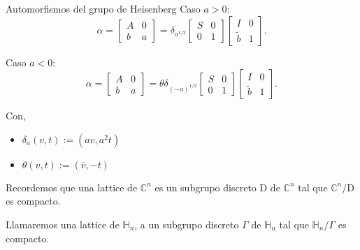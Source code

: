 \documentclass{beamer}
\begin{document}
\begin{frame}{Automorfismos del grupo de Heisenberg}
Caso $a>0$:
 $$\alpha=
 \begin{bmatrix}
A & 0\\
b & a
\end{bmatrix}=
\delta_{a^{1/2}}
\begin{bmatrix}
S & 0\\
0 & 1
\end{bmatrix}
\begin{bmatrix}
I & 0\\
\tilde{b} & 1
\end{bmatrix}.
$$

Caso $a<0$:
$$\alpha=
 \begin{bmatrix}
A & 0\\
b & a
\end{bmatrix}=
\theta
\delta_{(-a)^{1/2}}
\begin{bmatrix}
S & 0\\
0 & 1
\end{bmatrix}
\begin{bmatrix}
I & 0\\
\tilde{b} & 1
\end{bmatrix}.
$$

Con, 
\begin{itemize}
\item $\delta_a (v,t) :=(a v,a^2 t)$
\item $\theta(v,t):=(\overline{v},-t)$
\end{itemize}
\end{frame}

\begin{frame}
 \begin{definition}
 Recordemos que una lattice de $\mathbb{C}^n$ es un subgrupo discreto D de $\mathbb{C}^n$ tal que $\mathbb{C}^n$/D es compacto.
\end{definition}

\begin{definition}
 Llamaremos una lattice de $\mathbb{H}_n$, a un subgrupo discreto $\Gamma$ de $\mathbb{H}_n$ tal que $\mathbb{H}_n/\Gamma$ es compacto.
\end{definition}

\end{frame}
\end{document}
